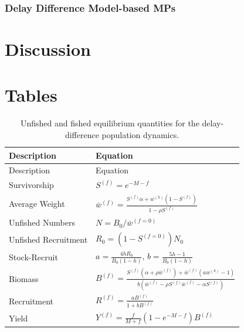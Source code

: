 \documentclass[]{article}
\begin{document}
\hypertarget{delay-difference-model-based-mps}{%
\subsubsection{Delay Difference Model-based MPs}\label{delay-difference-model-based-mps}}

\hypertarget{discussion}{%
\section{Discussion}\label{discussion}}

\newpage

\hypertarget{tables}{%
\section{Tables}\label{tables}}

\begin{longtable}[]{@{}ll@{}}
\caption{\label{tab:ddEqbmTable}Unfished and fished equilibrium quantities for the delay-difference population dynamics.}\tabularnewline
\toprule
Description & Equation\tabularnewline
\midrule
\endfirsthead
\toprule
Description & Equation\tabularnewline
\midrule
\endhead
Survivorship & \(S^{(f)} = e^{- M - f}\)\tabularnewline
Average Weight & \(\bar{w}^{(f)} = \frac{S^{(f)}\alpha + w^{(k)}(1 - S^{(f)})}{1 - \rho S^{(f)}}\)\tabularnewline
Unfished Numbers & \(N = B_{0} / \bar{w}^{(f=0)}\)\tabularnewline
Unfished Recruitment & \(R_{0} = (1 - S^{(f=0)})N_{0}\)\tabularnewline
Stock-Recruit & \(a = \frac{4hR_{0}}{B_{0}(1 - h)}\), \(b = \frac{5h - 1}{B_{0}(1 - h)}\)\tabularnewline
Biomass & \(B^{(f)} = \frac{ S^{(f)}(\alpha + \rho\bar{w}^{(f)}) + \bar{w}^{(f)}(aw^{(k)}-1)} {b(\bar{w}^{(f)} - \rho S^{(f)}\bar{w}^{(f)} - \alpha S^{(f)})}\)\tabularnewline
Recruitment & \(R^{(f)} = \frac{aB^{(f)}}{1+bB^{(f)}}\)\tabularnewline
Yield & \(Y^{(f)} = \frac{f}{M + f} (1 - e^{-M-f}) B^{(f)}\)\tabularnewline
\bottomrule
\end{longtable}

\newpage
\end{document}
